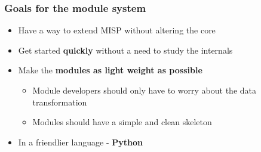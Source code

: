 \begin{frame}[fragile]
        \frametitle{Goals for the module system}
        \begin{itemize}
        \item Have a way to extend MISP without altering the core
        \item Get started {\bf quickly} without a need to study the internals
        \item Make the {\bf modules as light weight as possible}
            \begin{itemize}
                \item Module developers should only have to worry about the data transformation
                \item Modules should have a simple and clean skeleton
            \end{itemize}
        \item In a friendlier language - {\bf Python}
        \end{itemize}
\end{frame}

